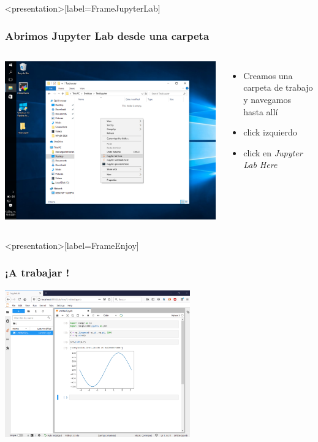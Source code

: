 \begin{frame}<presentation>[label=FrameJupyterLab]
  \frametitle{Abrimos Jupyter Lab desde una carpeta}

  \center

  \begin{columns}
    \includegraphics[height=0.7\textheight]{Screenshots/ClickIzquierdo.png}

    \begin{itemize}
	\item Creamos una carpeta de trabajo y navegamos hasta allí

	\item click izquierdo
	
	\item click en \emph{Jupyter Lab Here}

    \end{itemize}

  \end{columns}
\end{frame}

\begin{frame}<presentation>[label=FrameEnjoy]
  \frametitle{¡A trabajar !}

  \center
  \includegraphics[width=0.6\textwidth]{Screenshots/PlayHappy.png}

\end{frame}


